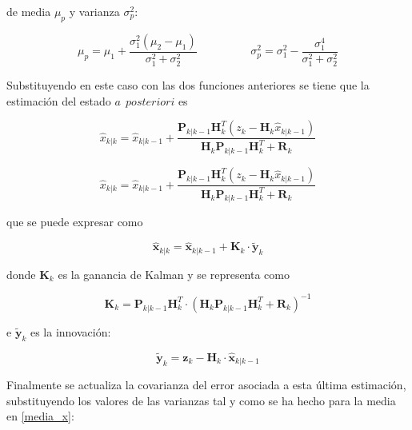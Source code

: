 \documentclass[twoside,11pt]{book}
\begin{document}
de media $\mu_{p}$ y varianza $\sigma^{2}_{p}$:

\begin{equation}
\mu_{p}=\mu_{1}+\frac{\sigma^{2}_{1}(\mu_{2}-\mu_{1})}{\sigma^{2}_{1}+\sigma^{2}_{2}} \hspace{2cm} \sigma^{2}_{p} = \sigma^{2}_{1} - \frac{\sigma^{4}_{1}}{\sigma^{2}_{1} + \sigma^{2}_{2}} 
\end{equation}	

Substituyendo en este caso con las dos funciones anteriores se tiene que la estimación del estado $a \>\> posteriori$ es 

\begin{equation}
\hat{x}_{k|k}=\hat{x}_{k|k-1} + \frac{\mathbf{P}_{k|k-1}\mathbf{H}^{T}_{k}(z_{k}-\mathbf{H}_{k}\hat{x}_{k|k-1})}{\mathbf{H}_{k} \mathbf{P}_{k|k-1} \mathbf{H}_{k}^{T} + \mathbf{R}_{k}}
\label{media_x}
\end{equation}



\begin{equation}
\hat{x}_{k|k}=\hat{x}_{k|k-1} + \frac{\mathbf{P}_{k|k-1}\mathbf{H}^{T}_{k}(z_{k}-\mathbf{H}_{k}\hat{x}_{k|k-1})}{\mathbf{H}_{k} \mathbf{P}_{k|k-1} \mathbf{H}_{k}^{T} + \mathbf{R}_{k}}
\end{equation}

que se puede expresar como

\begin{equation}
\hat{\mathbf{x}}_{k|k}=\hat{\mathbf{x}}_{k|k-1}+\mathbf{K}_{k}\cdot \tilde{\mathbf{y}}_{k}
\end{equation}

donde $\mathbf{K}_{k}$ es la ganancia de Kalman y se representa como

\begin{equation}
\mathbf{K}_{k}=\mathbf{P}_{k|k-1} \mathbf{H}_{k}^{T} \cdot (\mathbf{H}_{k} \mathbf{P}_{k|k-1} \mathbf{H}_{k}^{T} + \mathbf{R}_{k})^{-1}
\end{equation}

e $\tilde{\mathbf{y}}_{k}$ es la innovación:

\begin{equation}
\tilde{\mathbf{y}}_{k} = \mathbf{z}_{k} - \mathbf{H}_{k} \cdot \hat{\mathbf{x}}_{k|k-1}
\end{equation}


Finalmente se actualiza la covarianza del error asociada a esta última estimación, substituyendo los valores de las varianzas tal y como se ha hecho para la media en \ref{media_x}:
\end{document}
